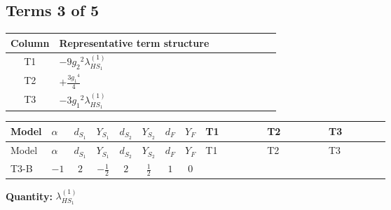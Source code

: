 \documentclass[8pt]{article}
\begin{document}
\begin{landscape}
\subsection*{Terms 3 of 5}
\begin{center}
\begin{tabular}{@{}c >{\raggedright\arraybackslash}p{0.82\linewidth}@{}}
\toprule
Column & Representative term structure \\
\midrule
T1 & \(\displaystyle -9 {g_2}^2 {\lambda_{HS_1}^{(1)}}\) \\
\midrule
T2 & \(\displaystyle +\frac{3 {g_1}^4}{4}\) \\
\midrule
T3 & \(\displaystyle -3 {g_1}^2 {\lambda_{HS_1}^{(1)}}\) \\
\midrule
\bottomrule
\end{tabular}
\end{center}
\smallskip
\tiny
\begin{longtable}{@{}llcccccc >{\raggedright\arraybackslash}p{0.21\linewidth} >{\raggedright\arraybackslash}p{0.21\linewidth} >{\raggedright\arraybackslash}p{0.21\linewidth}@{}}
\toprule
Model & $\alpha$ & $d_{S_1}$ & $Y_{S_1}$ & $d_{S_2}$ & $Y_{S_2}$ & $d_F$ & $Y_F$ & T1 & T2 & T3 \\
\midrule
\endfirsthead
\toprule
Model & $\alpha$ & $d_{S_1}$ & $Y_{S_1}$ & $d_{S_2}$ & $Y_{S_2}$ & $d_F$ & $Y_F$ & T1 & T2 & T3 \\
\midrule
\endhead
T3-B & $-1$ & $2$ & $-\frac{1}{2}$ & $2$ & $\frac{1}{2}$ & $1$ & $0$ & \scriptsize\adjustbox{max width=\linewidth}{$\begin{gathered} -9 {g_2}^2 {\lambda_{HS_1}^{(1)}}\end{gathered}$} & \scriptsize\adjustbox{max width=\linewidth}{$\begin{gathered} +\frac{3 {g_1}^4}{4}\end{gathered}$} & \scriptsize\adjustbox{max width=\linewidth}{$\begin{gathered} -3 {g_1}^2 {\lambda_{HS_1}^{(1)}}\end{gathered}$} \\
\midrule
\bottomrule
\end{longtable}
\clearpage
\noindent\textbf{Quantity: }$\lambda_{HS_1}^{(1)}$\par\smallskip

\end{landscape}
\end{document}
